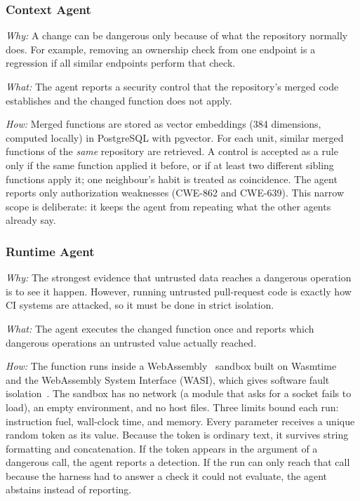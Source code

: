 \documentclass[conference]{IEEEtran}
\begin{document}
\subsubsection{Context Agent}
\textit{Why:} A change can be dangerous only because of what the
repository normally does. For example, removing an ownership check from
one endpoint is a regression if all similar endpoints perform that check.

\textit{What:} The agent reports a security control that the repository's
merged code establishes and the changed function does not apply.

\textit{How:} Merged functions are stored as vector embeddings (384
dimensions, computed locally) in PostgreSQL with pgvector. For each unit,
similar merged functions of the \emph{same} repository are retrieved.
A control is accepted as a rule only if the same function applied it
before, or if at least two different sibling functions apply it; one
neighbour's habit is treated as coincidence. The agent reports only
authorization weaknesses (CWE-862 and CWE-639). This narrow scope is
deliberate: it keeps the agent from repeating what the other agents
already say.

\subsubsection{Runtime Agent}
\textit{Why:} The strongest evidence that untrusted data reaches a
dangerous operation is to see it happen. However, running untrusted
pull-request code is exactly how CI systems are attacked, so it must be
done in strict isolation.

\textit{What:} The agent executes the changed function once and reports
which dangerous operations an untrusted value actually reached.

\textit{How:} The function runs inside a WebAssembly~\cite{haas2017wasm}
sandbox built on Wasmtime~\cite{wasmtime} and the WebAssembly System
Interface (WASI), which gives software fault isolation~\cite{wahbe1993sfi}.
The sandbox has no network (a module that asks for a socket fails to load),
an empty environment, and no host files. Three limits bound each run:
instruction fuel, wall-clock time, and memory. Every
parameter receives a unique random token as its value. Because the token
is ordinary text, it survives string formatting and concatenation. If the
token appears in the argument of a dangerous call, the agent reports a
detection. If the run can only reach that call because the harness had to
answer a check it could not evaluate, the agent abstains instead of
reporting.
\end{document}
